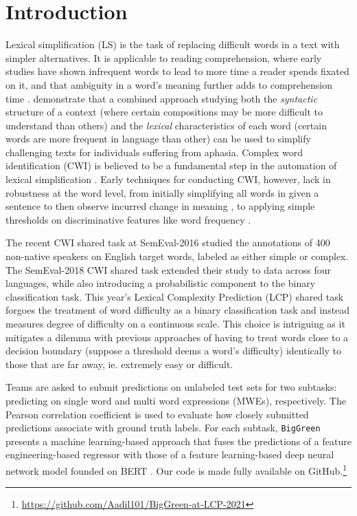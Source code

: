 \documentclass{dcthesis}
\theoremstyle{definition}
\theoremstyle{remark}
\begin{document}
\chapter{Introduction}

Lexical simplification (LS) is the task of replacing difficult words in a text with simpler alternatives. It is applicable to reading comprehension, where early studies have shown infrequent words to lead to more time a reader spends fixated on it, and that ambiguity in a word's meaning further adds to comprehension time \citep{raynerd86}. \citet{devlin} demonstrate that a combined approach studying both the \textit{syntactic} structure of a context (where certain compositions may be more difficult to understand than others) and the \textit{lexical} characteristics of each word (certain words are more frequent in language than other) can be used to simplify challenging texts for individuals suffering from aphasia. Complex word identification (CWI) is believed to be a fundamental step in the automation of lexical simplification \citep{shardlow2014open}. 
Early techniques for conducting CWI, however, lack in robustness at the word level, from initially simplifying all words in given a sentence to then observe incurred change in meaning \citep{devlintait}, to applying simple thresholds on discriminative features like word frequency \citep{10.1007/11573067_19}.

The recent CWI shared task at SemEval-2016 \citep{paetzoldspecia:2016:SemEval1} studied the annotations of 400 non-native speakers on English target words, labeled as either simple or complex. The SemEval-2018 CWI shared task \citep{stajner-EtAl:2018:BEA} extended their study to data across four languages, while also introducing a probabilistic component to the binary classification task. This year's Lexical Complexity Prediction (LCP) shared task \citep{shardlow2020complex} forgoes the treatment of word difficulty as a binary classification task \citep{paetzoldspecia:2016:SemEval1, stajner-EtAl:2018:BEA} and instead measures degree of difficulty on a continuous scale. This choice is intriguing as it mitigates a dilemma with previous approaches of having to treat words close to a decision boundary (suppose a threshold deems a word's difficulty) identically to those that are far away, ie. extremely easy or difficult.

Teams are asked to submit predictions on unlabeled test sets for two subtasks: predicting on single word and multi word expressions (MWEs), respectively. The Pearson correlation coefficient is used to evaluate how closely submitted predictions associate with ground truth labels. For each subtask, \texttt{BigGreen} presents a machine learning-based approach that fuses the predictions of a feature engineering-based regressor with those of a feature learning-based deep neural network model founded on BERT \citep{DBLP:journals/corr/abs-1810-04805}. Our code is made fully available on GitHub.\footnote{\url{https://github.com/Aadil101/BigGreen-at-LCP-2021}}
\end{document}
